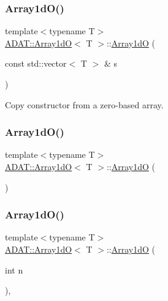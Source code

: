 \subsubsection{\texorpdfstring{Array1dO()}{Array1dO()}\hspace{0.1cm}{\footnotesize\ttfamily [5/10]}}
{\footnotesize\ttfamily template$<$typename T$>$ \\
\mbox{\hyperlink{classADAT_1_1Array1dO}{A\+D\+A\+T\+::\+Array1dO}}$<$ T $>$\+::\mbox{\hyperlink{classADAT_1_1Array1dO}{Array1dO}} (\begin{DoxyParamCaption}\item[{const std\+::vector$<$ T $>$ \&}]{s }\end{DoxyParamCaption})\hspace{0.3cm}{\ttfamily [inline]}}



Copy constructor from a zero-\/based array. 

\mbox{\label{classADAT_1_1Array1dO_af55d30db029bb654a123544dfc155e6a}} 
\subsubsection{\texorpdfstring{Array1dO()}{Array1dO()}\hspace{0.1cm}{\footnotesize\ttfamily [6/10]}}
{\footnotesize\ttfamily template$<$typename T$>$ \\
\mbox{\hyperlink{classADAT_1_1Array1dO}{A\+D\+A\+T\+::\+Array1dO}}$<$ T $>$\+::\mbox{\hyperlink{classADAT_1_1Array1dO}{Array1dO}} (\begin{DoxyParamCaption}{ }\end{DoxyParamCaption})\hspace{0.3cm}{\ttfamily [inline]}}

\mbox{\label{classADAT_1_1Array1dO_abd486987192b85b2cd27fd28660168bf}} 
\subsubsection{\texorpdfstring{Array1dO()}{Array1dO()}\hspace{0.1cm}{\footnotesize\ttfamily [7/10]}}
{\footnotesize\ttfamily template$<$typename T$>$ \\
\mbox{\hyperlink{classADAT_1_1Array1dO}{A\+D\+A\+T\+::\+Array1dO}}$<$ T $>$\+::\mbox{\hyperlink{classADAT_1_1Array1dO}{Array1dO}} (\begin{DoxyParamCaption}\item[{int}]{n }\end{DoxyParamCaption})\hspace{0.3cm}{\ttfamily [inline]}, {\ttfamily [explicit]}}

